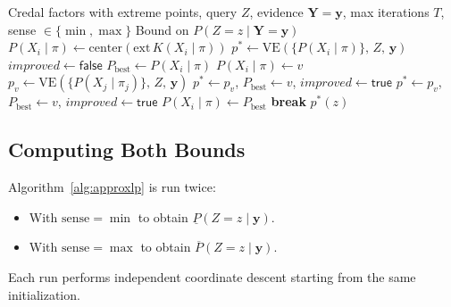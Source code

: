 \documentclass{article}
\begin{document}
\begin{algorithm}[H]
\caption{ApproxLP: Coordinate Descent over Extreme Points}
\label{alg:approxlp}
\begin{algorithmic}[1]
\Require Credal factors with extreme points, query $Z$, evidence $\mathbf{Y}{=}\mathbf{y}$,
         max iterations $T$, sense $\in \{\min, \max\}$
\Ensure Bound on $P(Z{=}z \mid \mathbf{Y}{=}\mathbf{y})$
\Statex
{}
  \State $P(X_i \mid \pi) \gets \mathrm{center}(\mathrm{ext}\,K(X_i \mid \pi))$
\EndFor
\State $p^* \gets \mathrm{VE}(\{P(X_i \mid \pi)\},\, Z,\, \mathbf{y})$
\Statex
{}
  \State $\mathit{improved} \gets \mathsf{false}$
      \State $P_{\mathrm{best}} \gets P(X_i \mid \pi)$
        \State $P(X_i \mid \pi) \gets v$
        \State $p_v \gets \mathrm{VE}(\{P(X_j \mid \pi_j)\},\, Z,\, \mathbf{y})$
          \State $p^* \gets p_v$, \quad $P_{\mathrm{best}} \gets v$, \quad $\mathit{improved} \gets \mathsf{true}$
          \State $p^* \gets p_v$, \quad $P_{\mathrm{best}} \gets v$, \quad $\mathit{improved} \gets \mathsf{true}$
        \EndIf
      \EndFor
      \State $P(X_i \mid \pi) \gets P_{\mathrm{best}}$
    \EndFor
  \EndFor
   \textbf{break}
  \EndIf
\EndFor
\State \Return $p^*(z)$
\end{algorithmic}
\end{algorithm}

\subsection{Computing Both Bounds}

Algorithm~\ref{alg:approxlp} is run twice:
\begin{itemize}
  \item With $\mathrm{sense} = \min$ to obtain $\underline{P}(Z{=}z \mid \mathbf{y})$.
  \item With $\mathrm{sense} = \max$ to obtain $\overline{P}(Z{=}z \mid \mathbf{y})$.
\end{itemize}
Each run performs independent coordinate descent starting from the same initialization.
\end{document}
